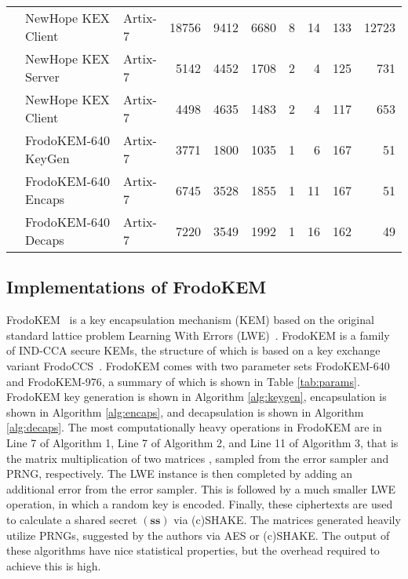 \begin{table}[tbhp]
\begin{center}
{\begin{tabular}{c l l N{5}{0} N{5}{0} N{5}{0} N{3}{0} N{3}{0} N{3}{0} N{5}{0}}
& \textsf{NewHope} KEX Client \cite{cryptoeprint:2017:690}   & Artix-7   & 18756 & 9412 & 6680 & 8 & 14 & 133 & 12723 \\  \Tstrut
& \textsf{NewHope} KEX Server \cite{oder2017implementing}   & Artix-7   & 5142 & 4452 & 1708 & 2 & 4 & 125 & 731 \\
& \textsf{NewHope} KEX Client \cite{oder2017implementing}  & Artix-7   & 4498 & 4635 & 1483 & 2 & 4 & 117 & 653 \\  \Tstrut
& \textsf{FrodoKEM}-640 KeyGen \cite{howe2018standard} & Artix-7 & 3771 & 1800 & 1035 & 1 & 6 & 167 & 51 \\
& \textsf{FrodoKEM}-640 Encaps \cite{howe2018standard}  & Artix-7 & 6745 & 3528 & 1855 & 1 & 11 & 167 & 51 \\
& \textsf{FrodoKEM}-640 Decaps \cite{howe2018standard}  & Artix-7 & 7220 & 3549 & 1992 & 1 & 16 & 162 & 49 \\ \hline
\end{tabular}}%
\end{center}
\end{table}

\subsection{Implementations of FrodoKEM}

FrodoKEM~\cite{frodokem} is a key encapsulation mechanism (KEM) based on the original standard lattice problem Learning With Errors (LWE)~\cite{Regev05}. FrodoKEM is a family of IND-CCA secure KEMs, the structure of which is based on a key exchange variant FrodoCCS~\cite{frodoccs}. FrodoKEM comes with two parameter sets FrodoKEM-640 and FrodoKEM-976, a summary of which is shown in Table \ref{tab:params}. FrodoKEM key generation is shown in Algorithm \ref{alg:keygen}, encapsulation is shown in Algorithm \ref{alg:encaps}, and decapsulation is shown in Algorithm \ref{alg:decaps}. The most computationally heavy operations in FrodoKEM are in Line 7 of Algorithm 1, Line 7 of Algorithm 2, and Line 11 of Algorithm 3, that is the matrix multiplication of two matrices , sampled from the error sampler and PRNG, respectively. The LWE instance is then completed by adding an additional error from the error sampler. This is followed by a much smaller LWE operation, in which a random key is encoded. Finally, these ciphertexts are used to calculate a shared secret $(\mathbf{ss})$ via (c)SHAKE. The matrices generated heavily utilize PRNGs, suggested by the authors via AES or (c)SHAKE. The output of these algorithms have nice statistical properties, but the overhead required to achieve this is high.

